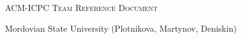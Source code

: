 \documentclass[a4paper]{article}
\begin{document}
\thispagestyle{fancy}

\begin{center}
	\Huge\textsc{ACM-ICPC Team Reference Document}

	\huge Mordovian State University (Plotnikova, Martynov, Deniskin)

	\vspace{0.50cm}
\end{center}

\begin{multicols*}{2}
    \tableofcontents

    \setcounter{page}{1}
    
\end{multicols*}



%
%	
\end{document}
